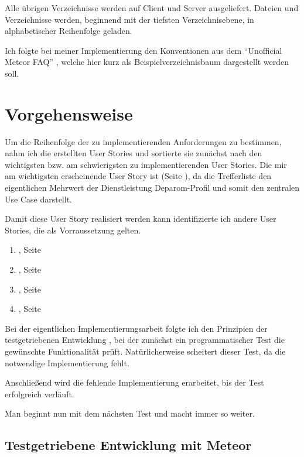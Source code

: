 Alle übrigen Verzeichnisse werden auf Client und Server ausgeliefert. Dateien
und Verzeichnisse werden, beginnend mit der tiefsten Verzeichnisebene, in
alphabetischer Reihenfolge geladen.

Ich folgte bei meiner Implementierung den Konventionen aus dem "`Unofficial
Meteor FAQ"' \cite{meteor-faq}, welche hier kurz als Beispielverzeichnisbaum
dargestellt werden soll.

\section{Vorgehensweise}

Um die Reihenfolge der zu implementierenden Anforderungen zu bestimmen, nahm ich
die erstellten User Stories und sortierte sie zunächst nach den wichtigsten bzw.
am schwierigsten zu implementierenden User Stories. Die mir am wichtigsten
erscheinende User Story ist  (Seite
\pageref{ch:SystemEntwurf:07}), da die Trefferliste den eigentlichen Mehrwert
der Dienstleistung Deparom-Profil und somit den zentralen Use Case darstellt.

Damit diese User Story realisiert werden kann identifizierte ich andere User
Stories, die als Vorraussetzung gelten.

\begin{enumerate}
  \item{, Seite \pageref{ch:SystemEntwurf:03}}
  \item{, Seite \pageref{ch:SystemEntwurf:04}}
  \item{, Seite \pageref{ch:SystemEntwurf:05}}
  \item{, Seite \pageref{ch:SystemEntwurf:06}}
\end{enumerate}

Bei der eigentlichen Implementierungsarbeit folgte ich den Prinzipien der
testgetriebenen Entwicklung \cite{tdd}, bei der zunächst ein programmatischer
Test die gewünschte Funktionalität prüft. Natürlicherweise scheitert dieser
Test, da die notwendige Implementierung fehlt.

Anschließend wird die fehlende Implementierung erarbeitet, bis der Test
erfolgreich verläuft.

Man beginnt nun mit dem nächsten Test und macht immer so weiter.

\subsection{Testgetriebene Entwicklung mit Meteor}

